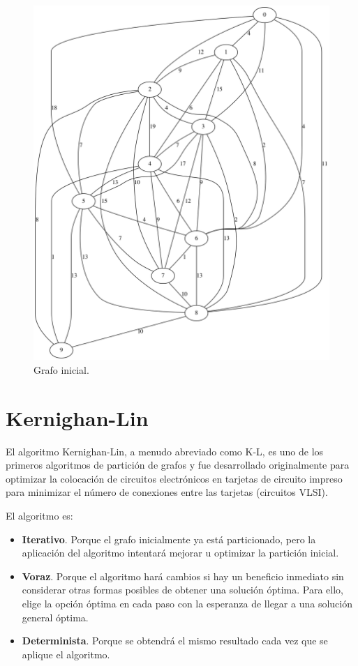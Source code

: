 \renewcommand{\figurename}{Figura}
\begin{figure}[h]
	\centering
	\includegraphics[scale=0.25]{Figures/10_dataset}
	\vspace{1mm}
	\caption{Grafo inicial.}
	\label{grafo}
\end{figure}

\newpage
\section{Kernighan-Lin}\label{Kernighan-Lin}

El algoritmo Kernighan-Lin\cite{KernighanLin}, a menudo abreviado como K-L, es uno de los primeros algoritmos de partición de grafos y fue desarrollado originalmente para optimizar la colocación de circuitos electrónicos en tarjetas de circuito impreso para minimizar el número de conexiones entre las tarjetas (circuitos VLSI\cite{KernighanLin}\cite{Ravikumar}).

El algoritmo es:

\begin{itemize}
	\setlength{\parskip}{0pt}
	\setlength{\itemsep}{0pt plus 1pt}
	\item \textbf{Iterativo}. Porque el grafo inicialmente ya está particionado, pero la aplicación del algoritmo intentará mejorar u optimizar la partición inicial. 
	\item \textbf{Voraz}. Porque el algoritmo hará cambios si hay un beneficio inmediato sin considerar otras formas posibles de obtener una solución óptima. Para ello, elige la opción óptima en cada paso con la esperanza de llegar a una solución general óptima.
	\item \textbf{Determinista}. Porque se obtendrá el mismo resultado cada vez que se aplique el algoritmo. 
\end{itemize}

